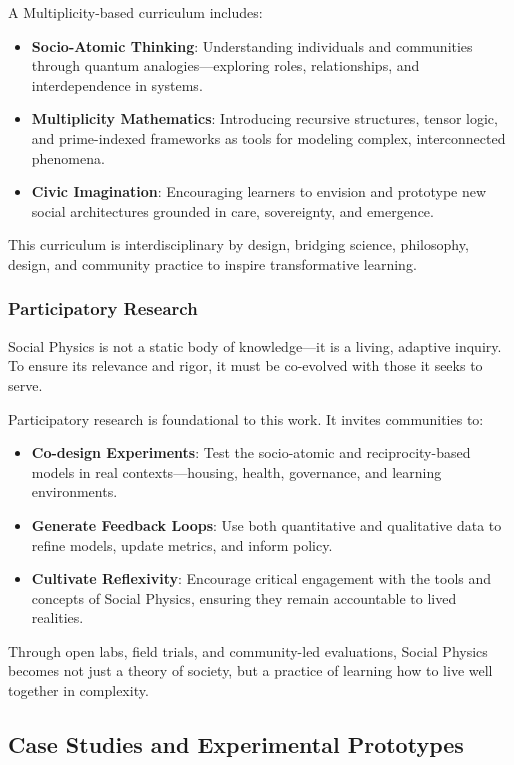 \documentclass{article}
\theoremstyle{plain}
\theoremstyle{claimstyle}
\begin{document}
A Multiplicity-based curriculum includes:

\begin{itemize}
    \item \textbf{Socio-Atomic Thinking}: Understanding individuals and communities through quantum analogies—exploring roles, relationships, and interdependence in systems.
    \item \textbf{Multiplicity Mathematics}: Introducing recursive structures, tensor logic, and prime-indexed frameworks as tools for modeling complex, interconnected phenomena.
    \item \textbf{Civic Imagination}: Encouraging learners to envision and prototype new social architectures grounded in care, sovereignty, and emergence.
\end{itemize}

This curriculum is interdisciplinary by design, bridging science, philosophy, design, and community practice to inspire transformative learning.

\subsubsection{Participatory Research}

Social Physics is not a static body of knowledge—it is a living, adaptive inquiry. To ensure its relevance and rigor, it must be co-evolved with those it seeks to serve.

Participatory research is foundational to this work. It invites communities to:

\begin{itemize}
    \item \textbf{Co-design Experiments}: Test the socio-atomic and reciprocity-based models in real contexts—housing, health, governance, and learning environments.
    \item \textbf{Generate Feedback Loops}: Use both quantitative and qualitative data to refine models, update metrics, and inform policy.
    \item \textbf{Cultivate Reflexivity}: Encourage critical engagement with the tools and concepts of Social Physics, ensuring they remain accountable to lived realities.
\end{itemize}

Through open labs, field trials, and community-led evaluations, Social Physics becomes not just a theory of society, but a practice of learning how to live well together in complexity.

\subsection{Case Studies and Experimental Prototypes}
\end{document}
